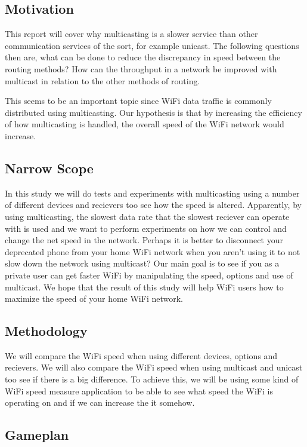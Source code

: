 \documentclass[10pt,a4paper]{article}
\begin{document}
\subsection{Motivation}

This report will cover why multicasting is a slower service than other communication services of the sort, for example unicast. The following questions then are, what can be done to reduce the discrepancy in speed between the routing methods? How can the throughput in a network be improved with multicast in relation to the other methods of routing.

This seems to be an important topic since WiFi data traffic is commonly distributed using multicasting. Our hypothesis is that by increasing the efficiency of how multicasting is handled, the overall speed of the WiFi network would increase.

\subsection{Narrow Scope}

In this study we will do tests and experiments with multicasting using a number of different devices and recievers too see how the speed is altered. Apparently, by using multicasting, the slowest data rate that the slowest reciever can operate with is used and we want to perform experiments on how we can control and change the net speed in the network. Perhaps it is better to disconnect your deprecated phone from your home WiFi network when you aren't using it to not slow down the network using multicast? 
Our main goal is to see if you as a private user can get faster WiFi by manipulating the speed, options and use of multicast. We hope that the result of this study will help WiFi users how to maximize the speed of your home WiFi network.

\subsection{Methodology}

We will compare the WiFi speed when using different devices, options and recievers. We will also compare the WiFi speed when using multicast and unicast too see if there is a big difference. To achieve this, we will be using some kind of WiFi speed measure application to be able to see what speed the WiFi is operating on and if we can increase the it somehow. 

\subsection{Gameplan}
\end{document}
